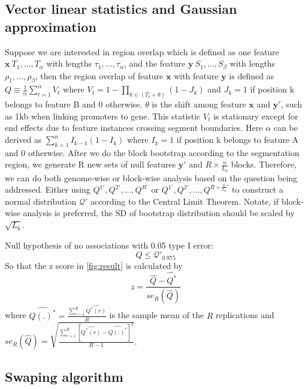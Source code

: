 \documentclass{article}
\begin{document}
\subsection{Vector linear statistics and Gaussian approximation}
Suppose we are interested in region overlap which is defined as one feature $\bm{x}\ T_1, ..., T_\alpha$ with lengths $\tau_1,..., \tau_\alpha$, and the feature $\bm{y}\ S_1, ..., S_\beta$ with lengths $\rho_1, ..., \rho_\beta$, then the region overlap of feature $\bm{x}$ with feature $\bm{y}$ is defined as $Q \equiv  \frac{1}{\alpha}\sum_{t=1}^\alpha V_t$ where $V_t=1-\prod_{k\in (T_t+\theta)}(1-J_k)$ and $J_k=1$ if position k belongs to feature B and 0 otherwise. $\theta$ is the shift among feature $\bm{x}$ and $\bm{y'}$, such as 1kb when linking promoters to gene. This statistic $V_t$ is stationary except for end effects due to feature instances crossing segment boundaries. Here $\alpha$ can be derived as $\sum_{k=1}^nI_{k-1}(1-I_k)$ where $I_k=1$ if position k belongs to feature A and 0 otherwise. After we do the block bootstrap according to the segmentation region, we generate R new sets of null features $\bm{y'}$ and $R\times \frac{n}{L_b}$ blocks. Therefore, we can do both genome-wise or block-wise analysis based on the question being addressed. Either using $Q^{1'}, Q^{2'}, ..., Q^{R'}$ or $Q^{1'}, Q^{2'}, ..., Q^{R\times \frac{n}{L_b}'}$ to construct a normal distribution $\mathcal{Q'}$ according to the Central Limit Theorem. Notate, if block-wise analysis is preferred, the SD of bootstrap distribution should be scaled by $\sqrt{L_b}$.

Null hypothesis of no associations with 0.05 type I error:
$$Q\leq \mathcal{Q'}_{0.975}$$
So that the z score in \cref{fig:result} is calculated by $$z = \frac{\widehat{Q} - \widehat{Q^*}}{ se_R(\widehat{Q})}$$ where $\widehat{Q(.)^*} = \frac{\sum_{r=1}^R \widehat{Q^*(r)}}{R}$ is the sample mean of the $R$ replications and $se_R(\widehat{Q}) = \sqrt{\frac{\sum_{r=1}^R [\widehat{Q^*(r)}-\widehat{Q(.)^*}]^2}{R-1}}$.


\subsection{Swaping algorithm}\label{sec:algorithm}
\end{document}
